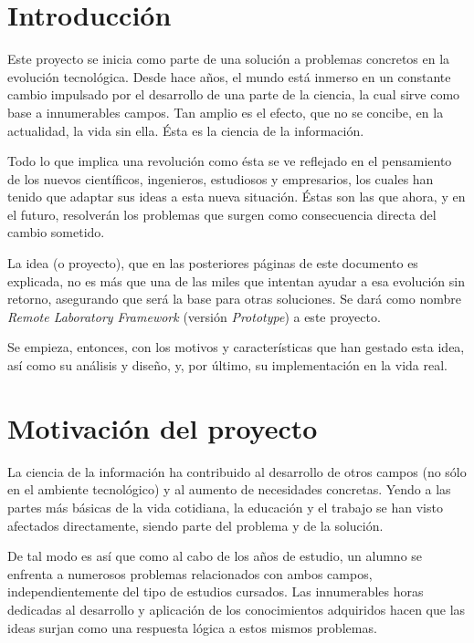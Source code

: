 

\section{Introducción}

Este proyecto se inicia como parte de una solución a problemas 
concretos en la evolución tecnológica. Desde hace años, el mundo 
está inmerso en un constante cambio impulsado por el desarrollo de una 
parte de la ciencia, la cual sirve como base a innumerables 
campos. Tan amplio es el efecto, que no se concibe, en la actualidad, 
la vida sin ella. Ésta es la ciencia de la información.

Todo lo que implica una revolución como ésta se ve reflejado en el 
pensamiento de los nuevos científicos, ingenieros, estudiosos y 
empresarios, los cuales han tenido que adaptar sus ideas a esta nueva 
situación. Éstas son las que ahora, y en el futuro, resolverán 
los problemas que surgen como consecuencia directa del cambio sometido.

La idea (o proyecto), que en las posteriores páginas de este documento es 
explicada, no es más que una de las miles que intentan ayudar a esa 
evolución sin retorno, asegurando que será la base para otras 
soluciones. Se dará como nombre \emph{Remote Laboratory Framework} 
(versión \emph{Prototype}) a este proyecto.

Se empieza, entonces, con los motivos y características que han 
gestado esta idea, así como su análisis y diseño, y, por último, su 
implementación en la vida real.

\section{Motivación del proyecto}

La ciencia de la información ha contribuido al desarrollo de otros 
campos (no sólo en el ambiente tecnológico) y al aumento de 
necesidades concretas. Yendo a las partes más básicas de la vida 
cotidiana, la educación y el trabajo se han visto afectados 
directamente, siendo parte del problema y de la solución.

De tal modo es así que como al cabo de los años de estudio, un alumno se enfrenta a 
numerosos problemas relacionados con ambos campos, independientemente 
del tipo de estudios cursados. Las innumerables horas dedicadas al 
desarrollo y aplicación de los conocimientos adquiridos hacen que las 
ideas surjan como una respuesta lógica a estos mismos problemas.

